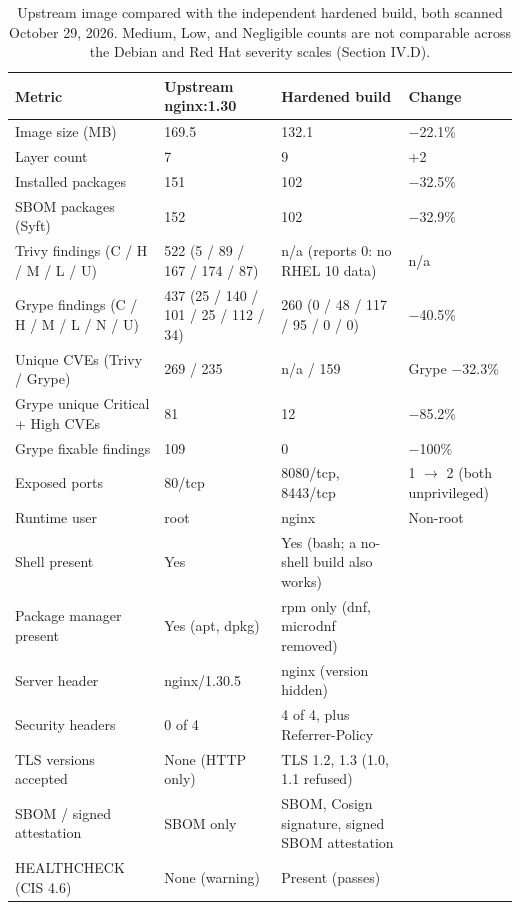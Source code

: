 \documentclass[10pt,letterpaper,twocolumn]{article}
\begin{document}
\begin{table}[t]
\caption{Upstream image compared with the independent hardened build, both scanned October 29, 2026. Medium, Low, and Negligible counts are not comparable across the Debian and Red Hat severity scales (Section IV.D).}
\label{tab:comparison}
\small
\begin{tabularx}{\textwidth}{@{}P{0.28\textwidth}P{0.23\textwidth}LP{0.17\textwidth}@{}}
\toprule
\textbf{Metric} & \textbf{Upstream nginx:1.30} & \textbf{Hardened build} & \textbf{Change} \\
\midrule
Image size (MB) & 169.5 & 132.1 & $-$22.1\% \\
Layer count & 7 & 9 & +2 \\
Installed packages & 151 & 102 & $-$32.5\% \\
SBOM packages (Syft) & 152 & 102 & $-$32.9\% \\
Trivy findings (C / H / M / L / U) & 522 (5 / 89 / 167 / 174 / 87) & n/a (reports 0: no RHEL 10 data) & n/a \\
Grype findings (C / H / M / L / N / U) & 437 (25 / 140 / 101 / 25 / 112 / 34) & 260 (0 / 48 / 117 / 95 / 0 / 0) & $-$40.5\% \\
Unique CVEs (Trivy / Grype) & 269 / 235 & n/a / 159 & Grype $-$32.3\% \\
Grype unique Critical + High CVEs & 81 & 12 & $-$85.2\% \\
Grype fixable findings & 109 & 0 & $-$100\% \\
Exposed ports & 80/tcp & 8080/tcp, 8443/tcp & 1 $\rightarrow$ 2 (both unprivileged) \\
Runtime user & root & nginx & Non-root \\
Shell present & Yes & Yes (bash; a no-shell build also works) & \\
Package manager present & Yes (apt, dpkg) & rpm only (dnf, microdnf removed) & \\
Server header & nginx/1.30.5 & nginx (version hidden) & \\
Security headers & 0 of 4 & 4 of 4, plus Referrer-Policy & \\
TLS versions accepted & None (HTTP only) & TLS 1.2, 1.3 (1.0, 1.1 refused) & \\
SBOM / signed attestation & SBOM only & SBOM, Cosign signature, signed SBOM attestation & \\
HEALTHCHECK (CIS 4.6) & None (warning) & Present (passes) & \\
\bottomrule
\end{tabularx}
\end{table}
\end{document}
